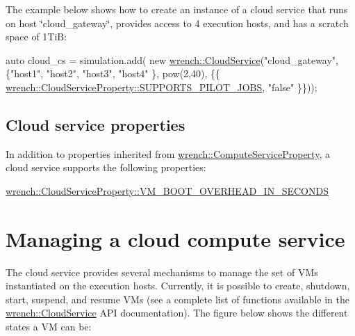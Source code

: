 The example below shows how to create an instance of a cloud service that runs on host \char`\"{}cloud\+\_\+gateway\char`\"{}, provides access to 4 execution hosts, and has a scratch space of 1\+TiB\+:


\begin{DoxyCode}
\textcolor{keyword}{auto} cloud\_cs = simulation.add(
          \textcolor{keyword}{new} \hyperlink{classwrench_1_1_cloud_service}{wrench::CloudService}(\textcolor{stringliteral}{"cloud\_gateway"}, \{\textcolor{stringliteral}{"host1"}, \textcolor{stringliteral}{"host2"}, \textcolor{stringliteral}{"host3"}, \textcolor{stringliteral}{"host4"}
      \}, pow(2,40),
                                   \{\{
      \hyperlink{classwrench_1_1_compute_service_property_af0abab1e3bce4932c4482031f0c31ce8}{wrench::CloudServiceProperty::SUPPORTS\_PILOT\_JOBS}, \textcolor{stringliteral}{"false"}
      \}\}));
\end{DoxyCode}
\hypertarget{guide-cloud_guide-cloud-creating-properties}{}\subsection{Cloud service properties}\label{guide-cloud_guide-cloud-creating-properties}
In addition to properties inherited from {\ttfamily \hyperlink{classwrench_1_1_compute_service_property}{wrench\+::\+Compute\+Service\+Property}}, a cloud service supports the following properties\+:


\begin{DoxyItemize}
\item {\ttfamily \hyperlink{classwrench_1_1_cloud_service_property_a7e2fddc7f539dedff89fb41635a5b200}{wrench\+::\+Cloud\+Service\+Property\+::\+V\+M\+\_\+\+B\+O\+O\+T\+\_\+\+O\+V\+E\+R\+H\+E\+A\+D\+\_\+\+I\+N\+\_\+\+S\+E\+C\+O\+N\+DS}}
\end{DoxyItemize}\hypertarget{guide-cloud_guide-cloud-managing}{}\section{Managing a cloud compute service}\label{guide-cloud_guide-cloud-managing}
The cloud service provides several mechanisms to manage the set of V\+Ms instantiated on the execution hosts. Currently, it is possible to create, shutdown, start, suspend, and resume V\+Ms (see a complete list of functions available in the \hyperlink{classwrench_1_1_cloud_service}{wrench\+::\+Cloud\+Service} A\+PI documentation). The figure below shows the different states a VM can be\+:

